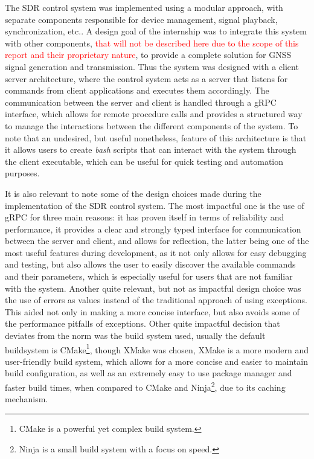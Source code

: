 The \gls{SDR} control system was implemented using a modular approach, with
separate components responsible for device management, signal playback,
synchronization, etc.. A design goal of the internship was to integrate this
system with other components, \textcolor{Red}{that will not be described here
  due to the scope of this report and their proprietary nature}, to provide a
complete solution for \gls{GNSS} signal generation and transmission. Thus the
system was designed with a client server architecture, where the control system
acts as a server that listens for commands from client applications and
executes them accordingly. The communication between the server and client is
handled through a \gls{gRPC} interface, which allows for remote procedure calls
and provides a structured way to manage the interactions between the different
components of the system. To note that an undesired, but useful nonetheless,
feature of this architecture is that it allows users to create \textit{bash}
scripts that can interact with the system through the client executable, which
can be useful for quick testing and automation purposes.

It is also relevant to note some of the design choices made during the
implementation of the \gls{SDR} control system. The most impactful one is the
use of \gls{gRPC} for three main reasons: it has proven itself in terms of
reliability and performance, it provides a clear and strongly typed interface
for communication between the server and client, and allows for reflection, the
latter being one of the most useful features during development, as it not only
allows for easy debugging and testing, but also allows the user to easily
discover the available commands and their parameters, which is especially
useful for users that are not familiar with the system. Another quite relevant,
but not as impactful design choice was the use of errors as values instead of
the traditional approach of using exceptions. This aided not only in making a
more concise interface, but also avoids some of the performance pitfalls of
exceptions. Other quite impactful decision that deviates from the norm was the
build system used, usually the default buildsystem is CMake\footnote{CMake is a
  powerful yet complex build system.\cite{cmake}}, though XMake was chosen, XMake
is a more modern and user-friendly build system, which allows for a more
concise and easier to maintain build configuration, as well as an extremely
easy to use package manager and faster build times, when compared to CMake and
Ninja\footnote{Ninja is a small build system with a focus on
  speed.\cite{ninja-build}}, due to its caching mechanism\cite{xmake}.

